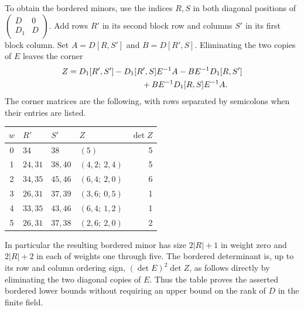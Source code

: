 To obtain the bordered minors, use the indices $R,S$ in both
diagonal positions of $\left(\begin{smallmatrix}D&0\\D_1&D
\end{smallmatrix}\right)$.  Add rows $R'$ in its second block row
and columns $S'$ in its first block column.  Set
$A=D[R,S']$ and $B=D[R',S]$.  Eliminating the two copies of $E$
leaves the corner
\begin{equation}
\begin{split}
 Z={}&D_1[R',S']-D_1[R',S]E^{-1}A
       -BE^{-1}D_1[R,S']\\
    &\hspace{27mm}+BE^{-1}D_1[R,S]E^{-1}A.
\end{split}
\label{eq:certificate-corner}
\end{equation}
The corner matrices are the following, with rows separated by
semicolons when their entries are listed.
\begin{center}
\begin{tabular}{c l l l r}
\toprule
$w$&$R'$&$S'$&$Z$&$\det Z$\\
\midrule
0&$34$&$38$&$(5)$&5\\
1&$24,31$&$38,40$&$(4,2;\ 2,4)$&5\\
2&$34,35$&$45,46$&$(6,4;\ 2,0)$&6\\
3&$26,31$&$37,39$&$(3,6;\ 0,5)$&1\\
4&$33,35$&$43,46$&$(6,4;\ 1,2)$&1\\
5&$26,31$&$37,38$&$(2,6;\ 2,0)$&2\\
\bottomrule
\end{tabular}
\end{center}
In particular the resulting bordered minor has size $2|R|+1$ in
weight zero and $2|R|+2$ in each of weights one through five.
The bordered determinant is, up to its row and column ordering
sign, $(\det E)^2\det Z$, as follows directly by eliminating the
two diagonal copies of $E$.  Thus the table proves the asserted
bordered lower bounds without requiring an upper bound on the
rank of $D$ in the finite field.

